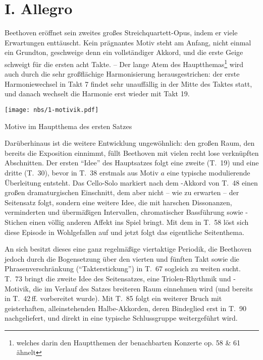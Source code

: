 \section{I. Allegro}

Beethoven eröffnet sein zweites großes Streichquartett-Opus, indem
er viele Erwartungen enttäuscht.  Kein prägnantes Motiv steht am
Anfang, nicht einmal ein Grundton, geschweige denn ein vollständiger
Akkord, und die erste Geige schweigt für die ersten acht Takte. – Der
lange Atem des Hauptthemas\footnote{welches darin den Hauptthemen
der benachbarten Konzerte op. 58 \& 61 ähnelt} wird auch durch die
sehr großflächige Harmonisierung herausgestrichen: der erste Harmoniewechsel
in Takt 7 findet sehr unauffällig in der Mitte des Taktes statt, und danach
wechselt die Harmonie erst wieder mit Takt 19.
\begin{notenbeispiel}
 \texttt{[image: nbs/1-motivik.pdf]}
 \caption{Motive im Hauptthema des ersten Satzes}
\end{notenbeispiel}


Darüberhinaus ist die weitere Entwicklung ungewöhnlich: den großen
Raum, den bereits die Exposition einnimmt, füllt Beethoven mit vielen
recht lose verknüpften Abschnitten.  Der ersten \enquote{Idee} des Hauptsatzes
folgt eine zweite (T.~19) und eine dritte (T.~30), bevor in T.~38
erstmals aus Motiv $a$ eine typische modulierende
Überleitung entsteht.  Das Cello-Solo markiert nach dem -Akkord
von T.~48 einen großen dramaturgischen Einschnitt, dem aber nicht –
wie zu erwarten – der Seitensatz folgt, sondern eine weitere Idee,
die mit harschen Dissonanzen, verminderten und übermäßigen Intervallen,
chromatischer Bassführung sowie -Stichen einen völlig
anderen Affekt ins Spiel bringt.  Mit dem  in T.~58 löst
sich diese Episode in Wohlgefallen auf und jetzt folgt das eigentliche
Seitenthema.

An sich besitzt dieses eine ganz regelmäßige viertaktige Periodik, die
Beethoven jedoch durch die Bogensetzung über den vierten und fünften Takt
sowie die Phrasenverschränkung (\enquote{Takterstickung}) in T.~67 sogleich
zu weiten sucht.  T.~73 bringt die zweite Idee des Seitensatzes, eine
Triolen-Rhythmik und -Motivik, die im Verlauf des Satzes breiteren Raum
einnehmen wird (und bereits in T.~42\,ff. vorbereitet wurde).  Mit T.~85
folgt ein weiterer Bruch mit geisterhaften, alleinstehenden Halbe-Akkorden,
deren Bindeglied  erst in T.~90 nachgeliefert, und direkt
in eine typische Schlussgruppe weitergeführt wird.

